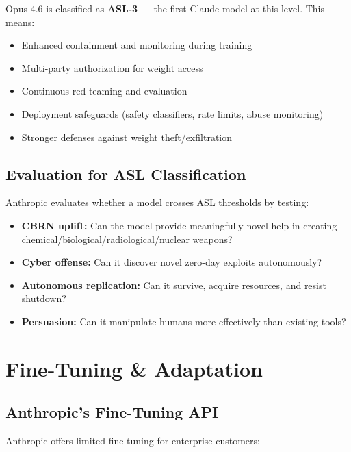 \documentclass[11pt,a4paper]{article}
\begin{document}
\begin{tcolorbox}[colback=orange!5, colframe=orange!60!black]
Opus 4.6 is classified as \textbf{ASL-3} --- the first Claude model at this level. This means:
\begin{itemize}[itemsep=1pt]
  \item Enhanced containment and monitoring during training
  \item Multi-party authorization for weight access
  \item Continuous red-teaming and evaluation
  \item Deployment safeguards (safety classifiers, rate limits, abuse monitoring)
  \item Stronger defenses against weight theft/exfiltration
\end{itemize}
\end{tcolorbox}

\subsection{Evaluation for ASL Classification}

Anthropic evaluates whether a model crosses ASL thresholds by testing:
\begin{itemize}[itemsep=1pt]
  \item \textbf{CBRN uplift:} Can the model provide meaningfully novel help in creating chemical/biological/radiological/nuclear weapons?
  \item \textbf{Cyber offense:} Can it discover novel zero-day exploits autonomously?
  \item \textbf{Autonomous replication:} Can it survive, acquire resources, and resist shutdown?
  \item \textbf{Persuasion:} Can it manipulate humans more effectively than existing tools?
\end{itemize}

\section{Fine-Tuning \& Adaptation}

\subsection{Anthropic's Fine-Tuning API}

Anthropic offers limited fine-tuning for enterprise customers:
\end{document}
